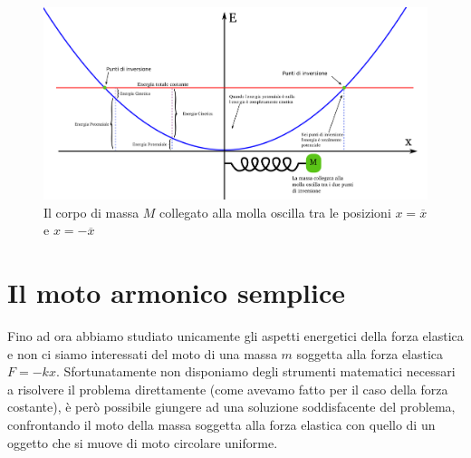 \documentclass[a4paper,10pt,oneside]{article}
\begin{document}
\begin{figure}[H]
 \centering
 \includegraphics[width=\textwidth]{./immagini/pontenziale_molla.png}
 \caption{Il corpo di massa $M$ collegato alla molla oscilla tra le posizioni $x=\overline x$ e $x=-\overline x$}\label{fig:potenziale1}
\end{figure}


\section*{Il moto armonico semplice}

Fino ad ora abbiamo studiato unicamente gli aspetti energetici della forza elastica e non ci siamo interessati del moto di una massa $m$ soggetta alla forza elastica $F=-kx$. Sfortunatamente non disponiamo degli strumenti matematici necessari a risolvere il problema direttamente (come avevamo fatto per il caso della forza costante), è però possibile giungere ad una soluzione soddisfacente del problema, confrontando il moto della massa soggetta alla forza elastica con quello di un oggetto che si muove di moto circolare uniforme.
\end{document}
